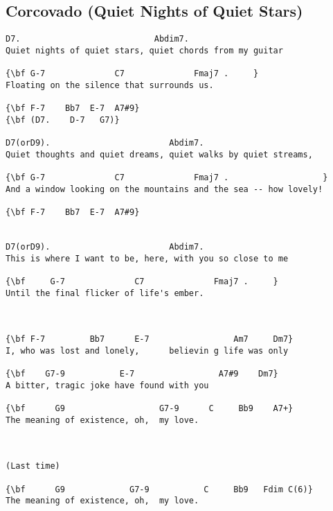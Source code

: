 \documentclass[a4paper]{article}
\begin{document}
\subsection{Corcovado (Quiet Nights of Quiet Stars)} %
\label{sub:Corcovado (Quiet Nights of Quiet Stars)}
\begin{Verbatim}[commandchars=\\\{\}]
D7.                           Abdim7.
Quiet nights of quiet stars, quiet chords from my guitar

{\bf G-7              C7              Fmaj7 .     }
Floating on the silence that surrounds us.

{\bf F-7    Bb7  E-7  A7#9}
{\bf (D7.    D-7   G7)}

D7(orD9).                        Abdim7.     
Quiet thoughts and quiet dreams, quiet walks by quiet streams,

{\bf G-7              C7              Fmaj7 .                   }
And a window looking on the mountains and the sea -- how lovely!

{\bf F-7    Bb7  E-7  A7#9}


D7(orD9).                        Abdim7.
This is where I want to be, here, with you so close to me

{\bf     G-7              C7              Fmaj7 .     }
Until the final flicker of life's ember.



{\bf F-7         Bb7      E-7                 Am7     Dm7}
I, who was lost and lonely,      believin g life was only

{\bf    G7-9           E-7                 A7#9    Dm7}
A bitter, tragic joke have found with you

{\bf      G9                   G7-9      C     Bb9    A7+}
The meaning of existence, oh,  my love.



(Last time)

{\bf      G9             G7-9           C     Bb9   Fdim C(6)}
The meaning of existence, oh,  my love.
\end{Verbatim}
\newpage
\end{document}
